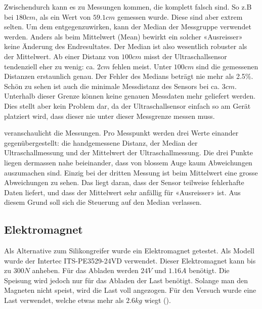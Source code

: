 Zwischendurch kann es zu Messungen kommen, die komplett falsch sind. So z.B bei $180cm$, als ein Wert von $59.1cm$ gemessen wurde. Diese sind aber extrem selten. Um dem entgegenzuwirken, kann der Median der Messgruppe verwendet werden. Anders als beim Mittelwert (Mean) bewirkt ein solcher «Ausreisser» keine Änderung des Endresultates. Der Median ist also wesentlich robuster als der Mittelwert. Ab einer Distanz von $100cm$ misst der Ultraschallsensor tendenziell eher zu wenig: ca. $2cm$ fehlen meist. Unter $100cm$ sind die gemessenen Distanzen erstaunlich genau. Der Fehler des Medians beträgt nie mehr als 2.5\%. Schön zu sehen ist auch die minimale Messdistanz des Sensors bei ca. $3cm$. Unterhalb dieser Grenze können keine genauen Messdaten mehr geliefert werden. Dies stellt aber kein Problem dar, da der Ultraschallsensor einfach so am Gerät platziert wird, dass dieser nie unter dieser Messgrenze messen muss.

 veranschaulicht die Messungen. Pro Messpunkt werden drei Werte einander gegenübergestellt: die handgemessene Distanz, der Median der Ultraschallmessung und der Mittelwert der Ultraschallmessung. Die drei Punkte liegen dermassen nahe beieinander, dass von blossem Auge kaum Abweichungen auszumachen sind. Einzig bei der dritten Messung ist beim Mittelwert eine grosse Abweichungen zu sehen. Das liegt daran, dass der Sensor teilweise fehlerhafte Daten liefert, und dass der Mittelwert sehr anfällig für «Ausreisser» ist. Aus diesem Grund soll sich die Steuerung auf den Median verlassen.

\subsection{Elektromagnet}
\label{app:elektromagnet}

Als Alternative zum Silikongreifer wurde ein Elektromagnet getestet. Als Modell wurde der Intertec ITS-PE3529-24VD  verwendet. Dieser Elektromagnet kann bis zu $300N$ anheben. Für das Abladen werden $24V$ und $1.16A$ benötigt. Die Speisung wird jedoch nur für das Abladen der Last benötigt. Solange man den Magneten nicht speist, wird die Last voll angezogen. Für den Versuch wurde eine Last verwendet, welche etwas mehr als $2.6kg$ wiegt ().

